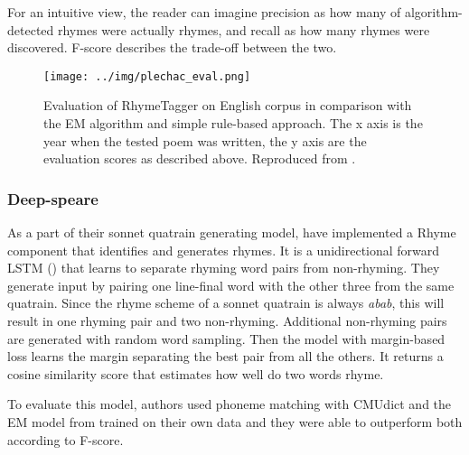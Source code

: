 For an intuitive view, the reader can imagine precision as how many of algorithm-detected rhymes were actually rhymes, and recall as how many rhymes were discovered. F-score describes the trade-off between the two.

\begin{figure}[h]\centering
	\texttt{[image: ../img/plechac\_eval.png]}
	\caption[RhymeTagger evaluation]{Evaluation of RhymeTagger on English corpus in comparison with the EM algorithm and simple rule-based approach. The x axis is the year when the tested poem was written, the y axis are the evaluation scores as described above. Reproduced from \cite{plechac2017presentation}.}
	\label{screenshotRT}
\end{figure}


\subsubsection*{Deep-speare}
As a part of their \gls{sonnet} \gls{quatrain} generating model, \cite{lau2018deep} have implemented a Rhyme component that identifies and generates rhymes. It is a unidirectional forward \gls{LSTM} (\cite{hochreiter1997long}) that learns to separate rhyming word pairs from non-rhyming. They generate input by pairing one line-final word with the other three from the same quatrain. Since the rhyme scheme of a \gls{sonnet} \gls{quatrain} is always \textit{abab}, this will result in one rhyming pair and two non-rhyming. Additional non-rhyming pairs are generated with random word sampling. Then the model with margin-based loss learns the margin separating the best pair from all the others. It returns a cosine similarity score that estimates how well do two words rhyme.

To evaluate this model, authors used phoneme matching with CMUdict and the EM model from \cite{reddy2011unsupervised} trained on their own data and they were able to outperform both according to F-score.



